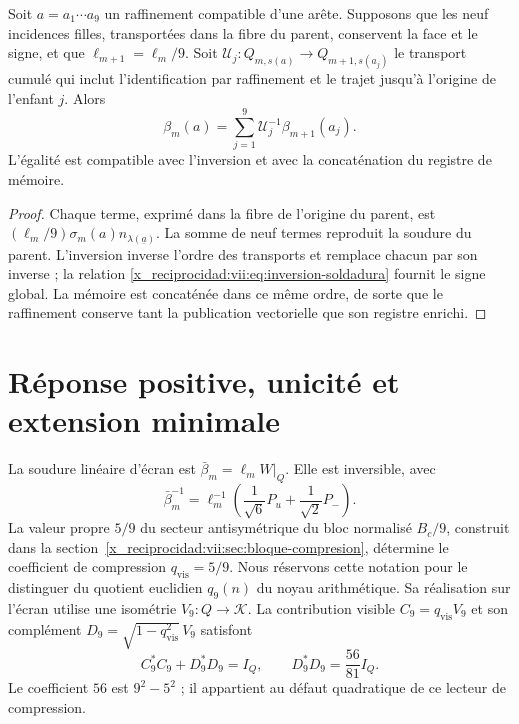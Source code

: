 \begin{proposition}
\label{x_reciprocidad:vii:prop:refinamiento-soldadura}
Soit \(a=a_1\cdots a_9\) un raffinement compatible d'une arête.
Supposons que les neuf incidences filles, transportées dans la fibre du
parent, conservent la face et le signe, et que
\(\ell_{m+1}=\ell_m/9\). Soit
\(\mathcal U_j:Q_{m,s(a)}\longrightarrow Q_{m+1,s(a_j)}\)
le transport cumulé qui inclut l'identification par raffinement
et le trajet jusqu'à l'origine de l'enfant \(j\). Alors
\[
 \beta_m(a)=
 \sum_{j=1}^{9}\mathcal U_j^{-1}\beta_{m+1}(a_j).
\]
L'égalité est compatible avec l'inversion et avec la concaténation du registre de mémoire.
\end{proposition}

\begin{proof}
Chaque terme, exprimé dans la fibre de l'origine du parent, est
\((\ell_m/9)\sigma_m(a)n_{\lambda(\underline a)}\).
La somme de neuf termes reproduit la soudure du parent.
L'inversion inverse l'ordre des transports et remplace chacun
par son inverse ; la relation \eqref{x_reciprocidad:vii:eq:inversion-soldadura} fournit
le signe global. La mémoire est concaténée dans ce même ordre, de sorte
que le raffinement conserve tant la publication vectorielle que son
registre enrichi.
\end{proof}

\section{Réponse positive, unicité et extension minimale}
\label{x_reciprocidad:vii:sec:respuesta-positiva}

La soudure linéaire d'écran est \(\bar\beta_m=\ell_mW|_Q\). Elle est inversible, avec
\[
 \bar\beta_m^{-1}
 =\ell_m^{-1}\left(\frac1{\sqrt6}P_u+\frac1{\sqrt2}P_-\right).
\]
La valeur propre \(5/9\) du secteur antisymétrique du bloc normalisé \(B_c/9\), construit dans la section~\ref{x_reciprocidad:vii:sec:bloque-compresion}, détermine le coefficient de compression \(q_{\mathrm{vis}}=5/9\). Nous réservons cette notation pour le distinguer du quotient euclidien \(q_9(n)\) du noyau arithmétique. Sa réalisation sur l'écran utilise une isométrie \(V_9:Q\longrightarrow\mathcal K\). La contribution visible \(C_9=q_{\mathrm{vis}}V_9\) et son complément \(D_9=\sqrt{1-q_{\mathrm{vis}}^2}\,V_9\) satisfont
\[
 C_9^*C_9+D_9^*D_9=I_Q,\qquad D_9^*D_9=\frac{56}{81}I_Q.
\]
Le coefficient \(56\) est \(9^2-5^2\) ; il appartient au défaut quadratique
de ce lecteur de compression.


